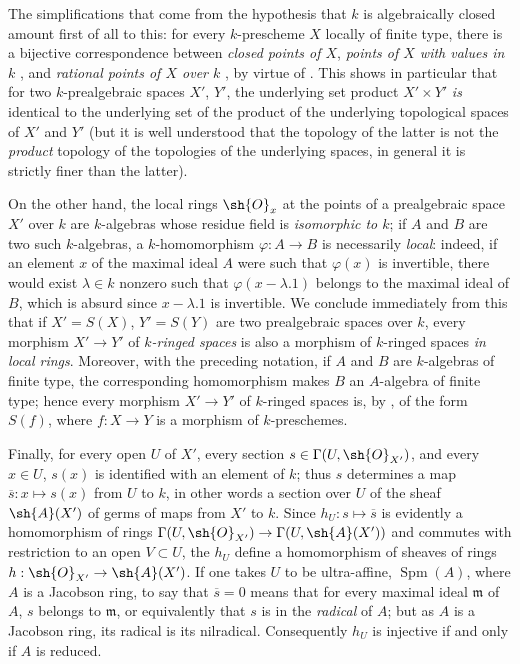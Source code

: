 \begin{env}[10.10.3]
\label{IV.10.10.3}
The simplifications that come from the hypothesis that $k$ is algebraically closed amount first of all to this: for every $k$-prescheme $X$ locally of finite type, there is a bijective correspondence between \emph{closed points of $X$}, \emph{points of $X$ with values in $k$} , and \emph{rational points of $X$ over $k$} , by virtue of .
This shows in particular  that for two $k$-prealgebraic spaces $X'$, $Y'$, the underlying set product $X'\times Y'$ \emph{is} identical to the underlying set of the product of the underlying topological spaces of $X'$ and $Y'$ (but it is well understood that the topology of the latter is not the \emph{product} topology of the topologies of the underlying spaces, in general it is strictly finer than the latter).

On the other hand, the local rings $\sh{O}_x$ at the points of a prealgebraic space $X'$ over $k$ are $k$-algebras whose residue field is \emph{isomorphic to $k$}; if $A$ and $B$ are two such $k$-algebras, a $k$-homomorphism $\varphi:A\to B$ is necessarily \emph{local}: indeed, if an element $x$ of the maximal ideal $A$ were such that $\varphi(x)$ is invertible, there would exist $\lambda\in k$ nonzero such that $\varphi(x-\lambda.1)$ belongs to the maximal ideal of $B$, which is absurd since $x-\lambda.1$ is invertible.
We conclude immediately from this that if $X'=S(X)$, $Y'=S(Y)$ are two prealgebraic spaces over $k$, every morphism $X'\to Y'$ of \emph{$k$-ringed spaces} is also a morphism of $k$-ringed spaces \emph{in local rings}. Moreover, with the preceding notation, if $A$ and $B$ are $k$-algebras of finite type, the corresponding homomorphism makes $B$ an $A$-algebra of finite type; hence every morphism $X'\to Y'$ of $k$-ringed spaces is, by , of the form $S(f)$, where $f:X\to Y$ is a morphism of $k$-preschemes.

Finally, for every open $U$ of $X'$, every section $s\in\Gamma(U,\sh{O}_{X'})$, and every $x\in U$, $s(x)$  is identified with an element of $k$; thus $s$ determines a map $\overline{s}:x\mapsto s(x)$ from $U$ to $k$, in other words a section over $U$ of the sheaf $\sh{A}(X')$ of germs of maps from $X'$ to $k$. Since $h_U:s\mapsto\overline{s}$ is evidently a homomorphism of rings $\Gamma(U,\sh{O}_{X'})\to\Gamma(U,\sh{A}(X'))$ and commutes with restriction to an open $V\subset U$, the $h_U$ define a homomorphism of sheaves of rings $h:\sh{O}_{X'}\to\sh{A}(X')$.
If one takes $U$ to be ultra-affine, $\operatorname{Spm}(A)$, where $A$ is a Jacobson ring, to say that $\overline{s}=0$ means that for every maximal ideal $\mathfrak{m}$ of $A$, $s$ belongs to $\mathfrak{m}$, or equivalently that $s$ is in the \emph{radical} of $A$; but as $A$ is a Jacobson ring, its radical is its nilradical. Consequently $h_U$ is injective if and only if $A$ is reduced.
\end{env}

